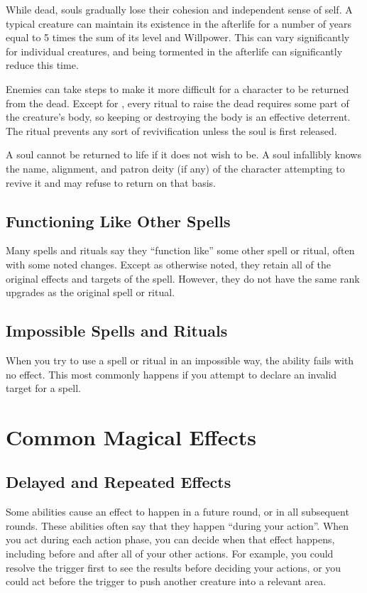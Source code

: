      While dead, souls gradually lose their cohesion and independent sense of self.
    A typical creature can maintain its existence in the afterlife for a number of years equal to 5 times the sum of its level and Willpower.
    This can vary significantly for individual creatures, and being tormented in the afterlife can significantly reduce this time.

     Enemies can take steps to make it more difficult for a character to be returned from the dead.
    Except for , every ritual to raise the dead requires some part of the creature's body, so keeping or destroying the body is an effective deterrent.
    The  ritual prevents any sort of revivification unless the soul is first released.

     A soul cannot be returned to life if it does not wish to be.
    A soul infallibly knows the name, alignment, and patron deity (if any) of the character attempting to revive it and may refuse to return on that basis.

  \subsection{Functioning Like Other Spells}\label{Functioning Like Other Spells}
    Many spells and rituals say they ``function like'' some other spell or ritual, often with some noted changes.
    Except as otherwise noted, they retain all of the original effects and targets of the spell.
    However, they do not have the same rank upgrades as the original spell or ritual.

  \subsection{Impossible Spells and Rituals}
    When you try to use a spell or ritual in an impossible way, the ability fails with no effect.
    This most commonly happens if you attempt to declare an invalid target for a spell.

\section{Common Magical Effects}
  \subsection{Delayed and Repeated Effects}\label{Delayed and Repeated Effects}
    Some abilities cause an effect to happen in a future round, or in all subsequent rounds.
    These abilities often say that they happen ``during your action''.
    When you act during each action phase, you can decide when that effect happens, including before and after all of your other actions.
    For example, you could resolve the trigger first to see the results before deciding your actions, or you could act before the trigger to push another creature into a relevant area.

